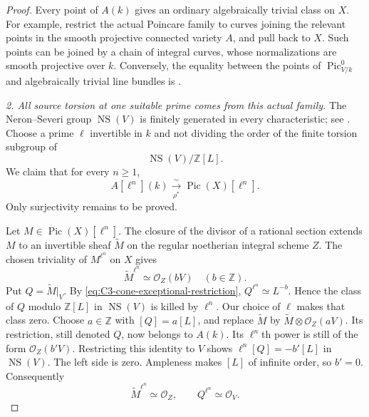 \begin{proof}
Every point of $A(k)$ gives an ordinary
algebraically trivial class on $X$. For example,
restrict the actual Poincare family to curves
joining the relevant points in the smooth
projective connected variety $A$, and pull
back to $X$. Such points can be joined by a
chain of integral curves, whose normalizations
are smooth projective over $k$. Conversely,
the equality between the points of
$\operatorname{Pic}^0_{V/k}$ and algebraically
trivial line bundles is
\citet[Proposition 5.10, pp.~41--42]{D_KleimanPicard2005v1}.

\emph{2. All source torsion at one suitable prime
comes from this actual family.}
The Neron--Severi group $\operatorname{NS}(V)$
is finitely generated in every characteristic;
see \citet[Theorem 7.3, p.~18]{D_ChengJiLarsonOlander2021}.
Choose a prime $\ell$ invertible in $k$ and not
dividing the order of the finite torsion subgroup
of
\[
                         \operatorname{NS}(V)/\mathbb Z[L].
\]
We claim that for every $n\ge1$,
\begin{equation}\label{eq:C3-cone-prime-torsion}
 A[\ell^n](k)\xrightarrow[\rho^*]{\ \sim\ }
                         \operatorname{Pic}(X)[\ell^n].
\end{equation}
Only surjectivity remains to be proved.

Let $M\in\operatorname{Pic}(X)[\ell^n]$.
The closure of the divisor of a rational
section extends $M$ to an invertible sheaf
$\widetilde M$ on the regular noetherian
integral scheme $Z$. The chosen triviality
of $M^{\ell^n}$ on $X$ gives
\[
                 \widetilde M^{\ell^n}\simeq\mathcal O_Z(bV)
                             \quad(b\in\mathbb Z).
\]
Put $Q=\widetilde M|_V$. By
\eqref{eq:C3-cone-exceptional-restriction},
$Q^{\ell^n}\simeq L^{-b}$. Hence the class
of $Q$ modulo $\mathbb Z[L]$ in
$\operatorname{NS}(V)$ is killed by $\ell^n$.
Our choice of $\ell$ makes that class zero.
Choose $a\in\mathbb Z$ with $[Q]=a[L]$,
and replace $\widetilde M$ by
$\widetilde M\otimes\mathcal O_Z(aV)$.
Its restriction, still denoted $Q$, now belongs
to $A(k)$. Its $\ell^n$th power is still of
the form $\mathcal O_Z(b'V)$.
Restricting this identity to $V$ shows
$\ell^n[Q]=-b'[L]$ in $\operatorname{NS}(V)$.
The left side is zero. Ampleness makes
$[L]$ of infinite order, so $b'=0$.
Consequently
\[
       \widetilde M^{\ell^n}\simeq\mathcal O_Z,
       \qquad Q^{\ell^n}\simeq\mathcal O_V.
\]


\end{proof}
